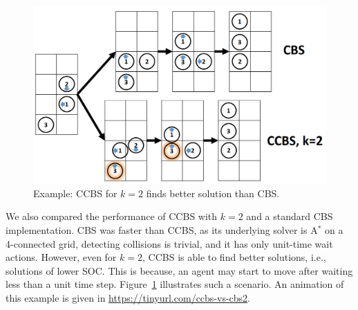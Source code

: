\documentclass[review]{elsarticle}
\newcommand{\commentout}[1]{ }
\newcommand{\ccbs}{\ac{CCBS}\xspace}
\newcommand{\cbs}{\ac{CBS}\xspace}
\newcommand{\astar}{A$^*$\xspace}
\begin{document}
\commentout{
\begin{figure}
    \centering
    \texttt{[image: soc-gain.PNG]}
    \caption{10$\times$10 open grid, gain of using \ccbs over  \cbs.}
    \label{fig:soc-gain}
\end{figure}
Figure~\ref{fig:soc-gain} shows the tradeoff of increasing $k$ by showing the average \emph{gain}, in terms of \ac{SOC}, of using \ccbs for different values of $k$
over \ccbs with $k=2$. The $x$-axis is the number of agents, and the $y$-axis is the gain, in percentage. We only provide data points for configurations with a success rate of at least 40\%. As can be seen, increasing $k$ increases the gain over \cbs, where for $k=4$ and $k=5$ the gain was over 20\%. Increasing $k$ also decreases the success rate, and thus the data series for larger $k$ value ``disappears'' after a smaller number of agents. 
}

\begin{figure}
    \centering
    \includegraphics[width=0.7\columnwidth]{anton-example.PNG}
    \caption{Example: \ccbs for $k=2$ finds better  solution than \cbs.}
    \label{fig:anton-example}
\end{figure}

We also compared the performance of \ccbs with $k=2$ and a standard \cbs implementation. 
\cbs was faster than \ccbs, as its underlying solver is \astar on a 4-connected grid, 
detecting collisions is trivial, and it has only unit-time wait actions. However, even for $k=2$, \ccbs is able to find better solutions, i.e., solutions of lower \ac{SOC}. This is because, an agent may start to move after waiting less than a unit time step. 
Figure~\ref{fig:anton-example} illustrates such a scenario. An animation of this example is given in \url{https://tinyurl.com/ccbs-vs-cbs2}. %
\end{document}

